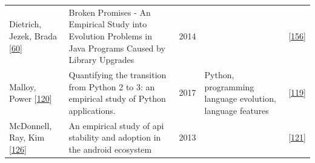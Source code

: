 \documentclass[]{book}
\begin{document}
\begin{longtable}[]{@{}lllll@{}}
\begin{minipage}[t]{0.12\columnwidth}\raggedright\strut
Dietrich, Jezek, Brada
{[}\protect\hyperlink{ref-Dietrich2014}{60}{]}\strut
\end{minipage} & \begin{minipage}[t]{0.31\columnwidth}\raggedright\strut
Broken Promises - An Empirical Study into Evolution Problems in Java
Programs Caused by Library Upgrades\strut
\end{minipage} & \begin{minipage}[t]{0.02\columnwidth}\raggedright\strut
2014\strut
\end{minipage} & \begin{minipage}[t]{0.24\columnwidth}\raggedright\strut
\strut
\end{minipage} & \begin{minipage}[t]{0.16\columnwidth}\raggedright\strut
{[}\protect\hyperlink{ref-Raemaekers2017}{156}{]}\strut
\end{minipage}\tabularnewline
\begin{minipage}[t]{0.12\columnwidth}\raggedright\strut
Malloy, Power {[}\protect\hyperlink{ref-Malloy2017}{120}{]}\strut
\end{minipage} & \begin{minipage}[t]{0.31\columnwidth}\raggedright\strut
Quantifying the transition from Python 2 to 3: an empirical study of
Python applications.\strut
\end{minipage} & \begin{minipage}[t]{0.02\columnwidth}\raggedright\strut
2017\strut
\end{minipage} & \begin{minipage}[t]{0.24\columnwidth}\raggedright\strut
Python, programming language evolution, language features\strut
\end{minipage} & \begin{minipage}[t]{0.16\columnwidth}\raggedright\strut
{[}\protect\hyperlink{ref-Malloy2018}{119}{]}\strut
\end{minipage}\tabularnewline
\begin{minipage}[t]{0.12\columnwidth}\raggedright\strut
McDonnell, Ray, Kim
{[}\protect\hyperlink{ref-McDonnell2013}{126}{]}\strut
\end{minipage} & \begin{minipage}[t]{0.31\columnwidth}\raggedright\strut
An empirical study of api stability and adoption in the android
ecosystem\strut
\end{minipage} & \begin{minipage}[t]{0.02\columnwidth}\raggedright\strut
2013\strut
\end{minipage} & \begin{minipage}[t]{0.24\columnwidth}\raggedright\strut
\strut
\end{minipage} & \begin{minipage}[t]{0.16\columnwidth}\raggedright\strut
{[}\protect\hyperlink{ref-Manikas2016}{121}{]}\strut
\end{minipage}\tabularnewline
\bottomrule
\end{longtable}
\end{document}
